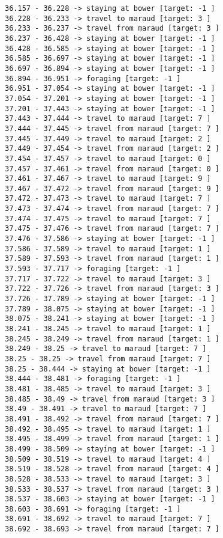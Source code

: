 \documentclass[11pt]{article}
\begin{document}
\begin{Verbatim}[commandchars=\\\{\}]
36.157 - 36.228 -> staying at bower [target: -1 ]
36.228 - 36.233 -> travel to maraud [target: 3 ]
36.233 - 36.237 -> travel from maraud [target: 3 ]
36.237 - 36.428 -> staying at bower [target: -1 ]
36.428 - 36.585 -> staying at bower [target: -1 ]
36.585 - 36.697 -> staying at bower [target: -1 ]
36.697 - 36.894 -> staying at bower [target: -1 ]
36.894 - 36.951 -> foraging [target: -1 ]
36.951 - 37.054 -> staying at bower [target: -1 ]
37.054 - 37.201 -> staying at bower [target: -1 ]
37.201 - 37.443 -> staying at bower [target: -1 ]
37.443 - 37.444 -> travel to maraud [target: 7 ]
37.444 - 37.445 -> travel from maraud [target: 7 ]
37.445 - 37.449 -> travel to maraud [target: 2 ]
37.449 - 37.454 -> travel from maraud [target: 2 ]
37.454 - 37.457 -> travel to maraud [target: 0 ]
37.457 - 37.461 -> travel from maraud [target: 0 ]
37.461 - 37.467 -> travel to maraud [target: 9 ]
37.467 - 37.472 -> travel from maraud [target: 9 ]
37.472 - 37.473 -> travel to maraud [target: 7 ]
37.473 - 37.474 -> travel from maraud [target: 7 ]
37.474 - 37.475 -> travel to maraud [target: 7 ]
37.475 - 37.476 -> travel from maraud [target: 7 ]
37.476 - 37.586 -> staying at bower [target: -1 ]
37.586 - 37.589 -> travel to maraud [target: 1 ]
37.589 - 37.593 -> travel from maraud [target: 1 ]
37.593 - 37.717 -> foraging [target: -1 ]
37.717 - 37.722 -> travel to maraud [target: 3 ]
37.722 - 37.726 -> travel from maraud [target: 3 ]
37.726 - 37.789 -> staying at bower [target: -1 ]
37.789 - 38.075 -> staying at bower [target: -1 ]
38.075 - 38.241 -> staying at bower [target: -1 ]
38.241 - 38.245 -> travel to maraud [target: 1 ]
38.245 - 38.249 -> travel from maraud [target: 1 ]
38.249 - 38.25 -> travel to maraud [target: 7 ]
38.25 - 38.25 -> travel from maraud [target: 7 ]
38.25 - 38.444 -> staying at bower [target: -1 ]
38.444 - 38.481 -> foraging [target: -1 ]
38.481 - 38.485 -> travel to maraud [target: 3 ]
38.485 - 38.49 -> travel from maraud [target: 3 ]
38.49 - 38.491 -> travel to maraud [target: 7 ]
38.491 - 38.492 -> travel from maraud [target: 7 ]
38.492 - 38.495 -> travel to maraud [target: 1 ]
38.495 - 38.499 -> travel from maraud [target: 1 ]
38.499 - 38.509 -> staying at bower [target: -1 ]
38.509 - 38.519 -> travel to maraud [target: 4 ]
38.519 - 38.528 -> travel from maraud [target: 4 ]
38.528 - 38.533 -> travel to maraud [target: 3 ]
38.533 - 38.537 -> travel from maraud [target: 3 ]
38.537 - 38.603 -> staying at bower [target: -1 ]
38.603 - 38.691 -> foraging [target: -1 ]
38.691 - 38.692 -> travel to maraud [target: 7 ]
38.692 - 38.693 -> travel from maraud [target: 7 ]

\end{Verbatim}
\end{document}

